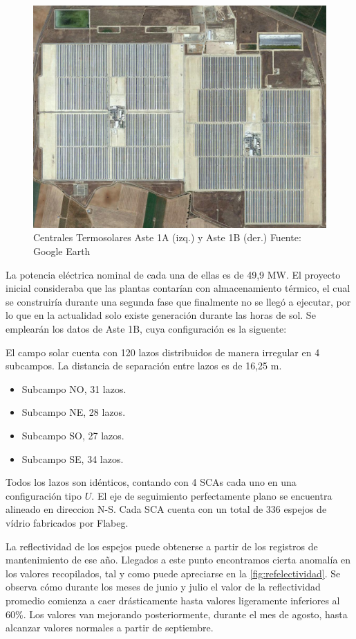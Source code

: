 \begin{figure}[H]
\includegraphics[width=0.9\linewidth]{images/fotoAstes.png}
\caption{Centrales Termosolares Aste 1A (izq.) y Aste 1B (der.) Fuente: Google Earth} 
\label{fig:astes}
\end{figure}

La potencia eléctrica nominal de cada una de ellas es de 49,9 MW. El proyecto inicial consideraba que las plantas contarían con almacenamiento térmico, el cual se construiría durante una segunda fase que finalmente no se llegó a ejecutar, por lo que en la actualidad solo existe generación durante las horas de sol. Se emplearán los datos de Aste 1B, cuya configuración es la siguente:

El campo solar cuenta con 120 lazos distribuidos de manera irregular en 4 subcampos. La  distancia de separación entre lazos es de 16,25 m. 

\begin{itemize}[itemsep=2pt,parsep=2pt]
\item
  Subcampo NO, 31 lazos.
\item
  Subcampo NE, 28 lazos.
\item
  Subcampo SO, 27 lazos.
\item
  Subcampo SE, 34 lazos.
\end{itemize}

Todos los lazos son idénticos, contando con 4 SCAs cada uno en una configuración tipo \(U\). El eje de seguimiento perfectamente plano se encuentra alineado en direccion N-S. Cada SCA cuenta con un total de 336 espejos de vídrio fabricados por Flabeg. 

La reflectividad de los espejos puede obtenerse a partir de los registros de mantenimiento de ese año. Llegados a este punto encontramos cierta anomalía en los valores recopilados, tal y como puede apreciarse en la \ref{fig:refelectividad}. Se observa cómo durante los meses de junio y julio el valor de la reflectividad promedio comienza a caer drásticamente hasta valores ligeramente inferiores al 60\%. Los valores van mejorando posteriormente, durante el mes de agosto, hasta alcanzar valores normales a partir de septiembre.


